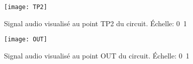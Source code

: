 \begin{figure}[h]
\begin{minipage}[c]{.45\linewidth}
\begin{center}
\texttt{[image: TP2]}
\caption{Signal audio visualisé au point TP2 du circuit. Échelle: \unit{0.1}{\volt}}
\label{TP2}
\end{center}
\end{minipage}
\hfill
\begin{minipage}[c]{.45\linewidth}
\begin{center}
\texttt{[image: OUT]}
\caption{Signal audio visualisé au point OUT du circuit. Échelle: \unit{0.1}{\volt}}
\label{out}
\end{center}
\end{minipage}
\end{figure}




